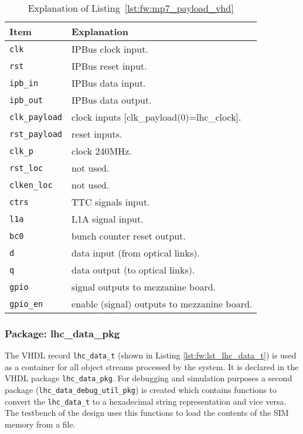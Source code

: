\medskip
\begin{table}
\footnotesize
\caption{Explanation of Listing~\ref{lst:fw:mp7_payload_vhd}}
\vspace{5mm}
\centering
\begin{tabular}{l p{}}
\toprule
{Item} & {Explanation}\\
\midrule
\verb|clk| & IPBus clock input.\\
\verb|rst| & IPBus reset input.\\
\verb|ipb_in| & IPBus data input.\\
\verb|ipb_out| & IPBus data output.\\
\verb|clk_payload| & clock inputs [clk\_payload(0)=lhc\_clock].\\
\verb|rst_payload| & reset inputs.\\
\verb|clk_p| & clock 240MHz.\\
\verb|rst_loc| & not used.\\
\verb|clken_loc| & not used.\\
\verb|ctrs| & TTC signals input.\\
\verb|l1a| & L1A signal input.\\
\verb|bc0| & bunch counter reset output.\\
\verb|d| & data input (from optical links).\\
\verb|q| & data output (to optical links).\\
\verb|gpio| & signal outputs to mezzanine board.\\
\verb|gpio_en| & enable (signal) outputs to mezzanine board.\\
\bottomrule
\end{tabular}
\label{tab:gtl:explanation_mp7_payload_vhd}
\end{table}

\clearpage

\subsubsection{Package: lhc\_data\_pkg} \label{sec:fw:section_lhc_data_pkg}

The VHDL record \texttt{lhc\_data\_t} (shown in Listing \ref{lst:fw:lst_lhc_data_t}) is used as a container for all object streams processed by the system. It is declared in the VHDL package \texttt{lhc\_data\_pkg}.
For debugging and simulation purposes a second package (\texttt{lhc\_data\_debug\_util\_pkg}) is created which contains functions to convert the \texttt{lhc\_data\_t} to a hexadecimal string representation and vice versa. The testbench of the design uses this functions to load the contents of the SIM memory from a file.



\clearpage
